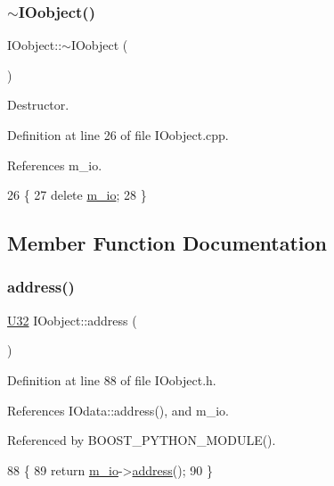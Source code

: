 \subsubsection{\texorpdfstring{$\sim$\+I\+Oobject()}{~IOobject()}}
{\footnotesize\ttfamily I\+Oobject\+::$\sim$\+I\+Oobject (\begin{DoxyParamCaption}{ }\end{DoxyParamCaption})\hspace{0.3cm}{\ttfamily [virtual]}}



Destructor. 



Definition at line 26 of file I\+Oobject.\+cpp.



References m\+\_\+io.


\begin{DoxyCode}
26                     \{
27   \textcolor{keyword}{delete} \hyperlink{classIOobject_aa648e4128c3c37d8291d6bb26b57c504}{m\_io};
28 \}
\end{DoxyCode}


\subsection{Member Function Documentation}
\mbox{\label{classIOobject_a95f0d3f092ea1ae3037ac60f0674d095}} 
\subsubsection{\texorpdfstring{address()}{address()}}
{\footnotesize\ttfamily \hyperlink{classIOobject_ad5bc21e44080074fe1068dc83861a090}{U32} I\+Oobject\+::address (\begin{DoxyParamCaption}{ }\end{DoxyParamCaption})\hspace{0.3cm}{\ttfamily [inline]}}



Definition at line 88 of file I\+Oobject.\+h.



References I\+Odata\+::address(), and m\+\_\+io.



Referenced by B\+O\+O\+S\+T\+\_\+\+P\+Y\+T\+H\+O\+N\+\_\+\+M\+O\+D\+U\+L\+E().


\begin{DoxyCode}
88                \{
89     \textcolor{keywordflow}{return} \hyperlink{classIOobject_aa648e4128c3c37d8291d6bb26b57c504}{m\_io}->\hyperlink{classIOdata_afe410c86881b8c2082a08e5ce9843306}{address}();
90   \}
\end{DoxyCode}
\mbox{\label{classIOobject_a1247f08c84c1732a76caf07e987871e9}} 
